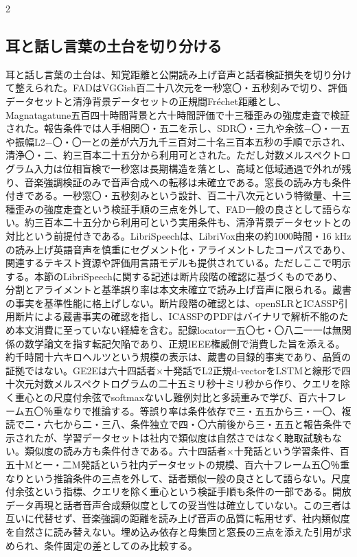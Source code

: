 \documentclass[lualatex,a4paper,10pt]{jlreq}
\begin{document}
\begin{multicols}{2}
\raggedcolumns
\subsection{耳と話し言葉の土台を切り分ける}
耳と話し言葉の土台は、知覚距離と公開読み上げ音声と話者検証損失を切り分けて整えられた。FADはVGGish百二十八次元を一秒窓〇・五秒刻みで切り、評価データセットと清浄背景データセットの正規間Fréchet距離とし、Magnatagatune五百四十時間背景と六十時間評価で十三種歪みの強度走査で検証された\autocite{btd088}。報告条件では人手相関〇・五二を示し、SDR〇・三九や余弦−〇・一五や振幅L2−〇・〇一との差が六万九千三百対二十名三百本五秒の手順で示され、清浄〇・二、約三百本二十五分から利用可とされた。ただし対数メルスペクトログラム入力は位相盲検で一秒窓は長期構造を落とし、高域と低域通過で外れが残り、音楽強調検証のみで音声合成への転移は未確立である\autocite{btd088}。窓長の読み方も条件付きである。一秒窓〇・五秒刻みという設計、百二十八次元という特徴量、十三種歪みの強度走査という検証手順の三点を外して、FAD一般の良さとして語らない。約三百本二十五分から利用可という実用条件も、清浄背景データセットとの対比という前提付きである\autocite{btd088}。LibriSpeechは、LibriVox由来の約1000時間・16 kHzの読み上げ英語音声を慎重にセグメント化・アライメントしたコーパスであり、関連するテキスト資源や評価用言語モデルも提供されている。ただしここで明示する。本節のLibriSpeechに関する記述は断片段階の確認に基づくものであり、分割とアライメントと基準誤り率は本文未確立で読み上げ音声に限られる。蔵書の事実を基準性能に格上げしない\autocite{btd089}。断片段階の確認とは、openSLRとICASSP引用断片による蔵書事実の確認を指し、ICASSPのPDFはバイナリで解析不能のため本文消費に至っていない経緯を含む。記録locator一五〇七・〇八二一一は無関係の数学論文を指す転記欠陥であり、正規IEEE権威側で消費した旨を添える。約千時間十六キロヘルツという規模の表示は、蔵書の目録的事実であり、品質の証拠ではない\autocite{btd089}。GE2Eは六十四話者×十発話でL2正規d-vectorをLSTMと線形で四十次元対数メルスペクトログラムの二十五ミリ秒十ミリ秒から作り、クエリを除く重心との尺度付余弦でsoftmaxないし難例対比と多読重みで学び、百六十フレーム五〇％重なりで推論する。等誤り率は条件依存で三・五五から三・一〇、複読で二・六七から二・三八、条件独立で四・〇六前後から三・五五と報告条件で示されたが、学習データセットは社内で類似度は自然さではなく聴取試験もない\autocite{btd090}。類似度の読み方も条件付きである。六十四話者×十発話という学習条件、百五十Mと一・二M発話という社内データセットの規模、百六十フレーム五〇％重なりという推論条件の三点を外して、話者類似一般の良さとして語らない。尺度付余弦という指標、クエリを除く重心という検証手順も条件の一部である。開放データ再現と話者音声合成類似度としての妥当性は確立していない\autocite{btd090}。この三者は互いに代替せず、音楽強調の距離を読み上げ音声の品質に転用せず、社内類似度を自然さに読み替えない。埋め込み依存と母集団と窓長の三点を添えた引用が求められ、条件固定の差としてのみ比較する\autocite{btd088,btd089,btd090}。


\end{multicols}
\end{document}
